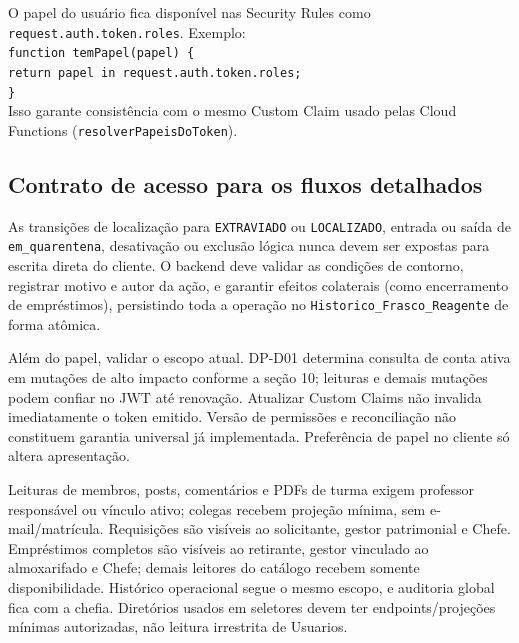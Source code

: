 \begin{regra}
O papel do usuário fica disponível nas Security Rules como \texttt{request.auth.token.roles}. Exemplo:\\
\texttt{function temPapel(papel) \{}\\
\texttt{\quad return papel in request.auth.token.roles;}\\
\texttt{\}}\\
Isso garante consistência com o mesmo Custom Claim usado pelas Cloud Functions (\texttt{resolverPapeisDoToken}).
\end{regra}


\subsection{Contrato de acesso para os fluxos detalhados}
\label{sec:acesso-detalhado}

\begin{regra}
As transições de localização para \texttt{EXTRAVIADO} ou \texttt{LOCALIZADO}, entrada ou saída de \texttt{em\_quarentena}, desativação ou exclusão lógica nunca devem ser expostas para escrita direta do cliente. O backend deve validar as condições de contorno, registrar motivo e autor da ação, e garantir efeitos colaterais (como encerramento de empréstimos), persistindo toda a operação no \texttt{Historico\_Frasco\_Reagente} de forma atômica.
\end{regra}

Além do papel, validar o escopo atual. DP-D01 determina consulta de conta ativa em mutações de alto impacto conforme a seção 10; leituras e demais mutações podem confiar no JWT até renovação. Atualizar Custom Claims não invalida imediatamente o token emitido. Versão de permissões e reconciliação não constituem garantia universal já implementada. Preferência de papel no cliente só altera apresentação.

Leituras de membros, posts, comentários e PDFs de turma exigem professor responsável ou vínculo ativo; colegas recebem projeção mínima, sem e-mail/matrícula. Requisições são visíveis ao solicitante, gestor patrimonial e Chefe. Empréstimos completos são visíveis ao retirante, gestor vinculado ao almoxarifado e Chefe; demais leitores do catálogo recebem somente disponibilidade. Histórico operacional segue o mesmo escopo, e auditoria global fica com a chefia. Diretórios usados em seletores devem ter endpoints/projeções mínimas autorizadas, não leitura irrestrita de Usuarios.

